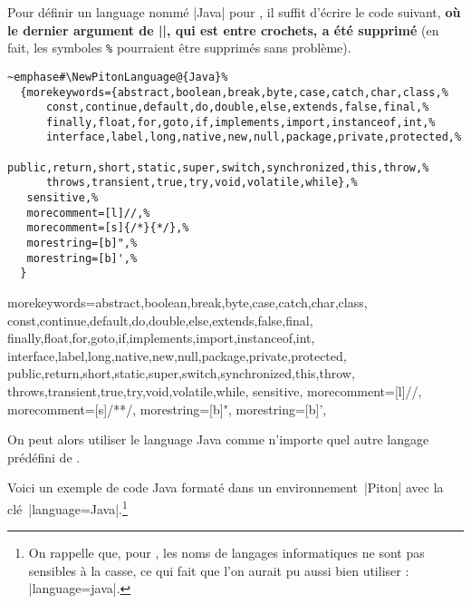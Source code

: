 \documentclass[dvipsnames,svgnames]{article}
\begin{document}
\medskip
Pour définir un language nommé |Java| pour , il suffit d'écrire le code
suivant, {\bfseries où le dernier argument de |\lst@definelanguage|, qui est entre
  crochets, a été supprimé} (en fait, les symboles \verb+%+ pourraient être supprimés sans
problème).

\medskip
\begin{small}
\begin{Verbatim}
~emphase#\NewPitonLanguage@{Java}%
  {morekeywords={abstract,boolean,break,byte,case,catch,char,class,%
      const,continue,default,do,double,else,extends,false,final,%
      finally,float,for,goto,if,implements,import,instanceof,int,%
      interface,label,long,native,new,null,package,private,protected,%
      public,return,short,static,super,switch,synchronized,this,throw,%
      throws,transient,true,try,void,volatile,while},%
   sensitive,%
   morecomment=[l]//,%
   morecomment=[s]{/*}{*/},%
   morestring=[b]",%
   morestring=[b]',%
  }
\end{Verbatim}
\end{small}

  {morekeywords={abstract,boolean,break,byte,case,catch,char,class,
      const,continue,default,do,double,else,extends,false,final,
      finally,float,for,goto,if,implements,import,instanceof,int,
      interface,label,long,native,new,null,package,private,protected,
      public,return,short,static,super,switch,synchronized,this,throw,
      throws,transient,true,try,void,volatile,while},
   sensitive,
   morecomment=[l]//,
   morecomment=[s]{/*}{*/},
   morestring=[b]",
   morestring=[b]',
  }


\medskip
On peut alors utiliser le language Java comme n'importe quel autre langage prédéfini de
.

Voici un exemple de code Java formaté dans un environnement~|{Piton}| avec la
clé~|language=Java|.\footnote{On rappelle que, pour , les noms de langages
  informatiques ne sont pas sensibles à la casse, ce qui fait que l'on aurait pu aussi
  bien utiliser : |language=java|.}
\end{document}
